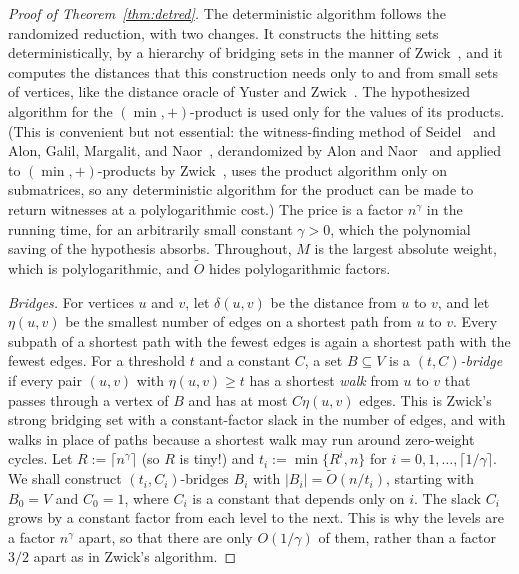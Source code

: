 \begin{proof}[Proof of Theorem~\ref{thm:detred}]
The deterministic algorithm follows the randomized reduction, with two changes. It constructs the hitting sets deterministically, by a hierarchy of bridging sets in the manner of Zwick~\cite[Section~6]{Zwi02}, and it computes the distances that this construction needs only to and from small sets of vertices, like the distance oracle of Yuster and Zwick~\cite{YZ05b}. The hypothesized algorithm for the $(\min,+)$-product is used only for the values of its products. (This is convenient but not essential: the witness-finding method of Seidel~\cite{Sei95} and Alon, Galil, Margalit, and Naor~\cite{AGMN92,GM93}, derandomized by Alon and Naor~\cite{AN96} and applied to $(\min,+)$-products by Zwick~\cite[Lemma~3.3]{Zwi02}, uses the product algorithm only on submatrices, so any deterministic algorithm for the product can be made to return witnesses at a polylogarithmic cost.) The price is a factor $n^{\gamma}$ in the running time, for an arbitrarily small constant $\gamma>0$, which the polynomial saving of the hypothesis absorbs. Throughout, $M$ is the largest absolute weight, which is polylogarithmic, and $\tilde O$ hides polylogarithmic factors.

\emph{Bridges.} For vertices $u$ and $v$, let $\delta(u,v)$ be the distance from $u$ to $v$, and let $\eta(u,v)$ be the smallest number of edges on a shortest path from $u$ to $v$. Every subpath of a shortest path with the fewest edges is again a shortest path with the fewest edges. For a threshold $t$ and a constant $C$, a set $B\subseteq V$ is a \emph{$(t,C)$-bridge} if every pair $(u,v)$ with $\eta(u,v)\ge t$ has a shortest \emph{walk} from $u$ to $v$ that passes through a vertex of $B$ and has at most $C\eta(u,v)$ edges. This is Zwick's strong bridging set with a constant-factor slack in the number of edges, and with walks in place of paths because a shortest walk may run around zero-weight cycles. Let $R:=\lceil n^{\gamma}\rceil$ (so $R$ is tiny!) and $t_i:=\min\{R^{i},n\}$ for $i=0,1,\dots,\lceil1/\gamma\rceil$. We shall construct $(t_i,C_i)$-bridges $B_i$ with $|B_i|=\tilde O(n/t_i)$, starting with $B_0=V$ and $C_0=1$, where $C_i$ is a constant that depends only on $i$. The slack $C_i$ grows by a constant factor from each level to the next. This is why the levels are a factor $n^{\gamma}$ apart, so that there are only $O(1/\gamma)$ of them, rather than a factor $3/2$ apart as in Zwick's algorithm.


\end{proof}

